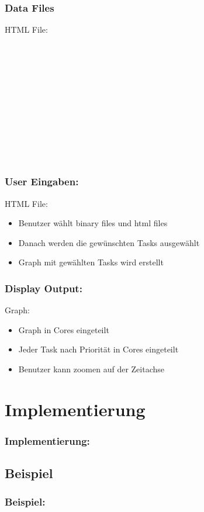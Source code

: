 \documentclass{beamer}
\begin{document}
\begin{frame}
	\frametitle{Data Files}
	\begin{block}{HTML File:}
			\\
			\\
			\\
			\\
			\\
			\\
			\\
			\\
			\\
			\\
			\\	
			\\			
	\end{block}
\end{frame}

\begin{frame}
	\frametitle{User Eingaben:}
	\begin{block}{HTML File:}
		\begin{itemize}
			\item Benutzer wählt binary files und html files
			\item Danach werden die gewünschten Tasks ausgewählt
			\item Graph mit gewählten Tasks wird erstellt
		\end{itemize}	
	\end{block}
\end{frame}

\begin{frame}
	\frametitle{Display Output:}
	\begin{block}{Graph:}
		\begin{itemize}
			\item Graph in Cores eingeteilt
			\item Jeder Task nach Priorität in Cores eingeteilt
			\item Benutzer kann zoomen auf der Zeitachse
		\end{itemize}	
	\end{block}
\end{frame}
\section{Implementierung}
\begin{frame}
	\frametitle{Implementierung:}
	\begin{block}{}
	\end{block}
\end{frame}
\begin{frame}
\section{Beispiel}
	\frametitle{Beispiel:}
\begin{block}{}
\end{block}
\end{frame}
\end{document}
